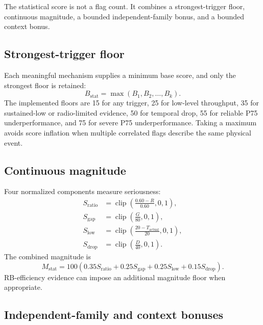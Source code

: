 The statistical score is not a flag count. It combines a strongest-trigger floor, continuous magnitude, a bounded independent-family bonus, and a bounded context bonus.

\subsection{Strongest-trigger floor}

Each meaningful mechanism supplies a minimum base score, and only the strongest floor is retained:
\begin{equation}
B_{\mathrm{stat}}=\max(B_1,B_2,\ldots,B_k).
\end{equation}
The implemented floors are 15 for any trigger, 25 for low-level throughput, 35 for sustained-low or radio-limited evidence, 50 for temporal drop, 55 for reliable P75 underperformance, and 75 for severe P75 underperformance. Taking a maximum avoids score inflation when multiple correlated flags describe the same physical event.

\subsection{Continuous magnitude}

Four normalized components measure seriousness:
\begin{align}
S_{\mathrm{ratio}}&=\operatorname{clip}\left(\frac{0.60-R}{0.60},0,1\right),\\
S_{\mathrm{gap}}&=\operatorname{clip}\left(\frac{G}{80},0,1\right),\\
S_{\mathrm{low}}&=\operatorname{clip}\left(\frac{20-T_{\mathrm{actual}}}{20},0,1\right),\\
S_{\mathrm{drop}}&=\operatorname{clip}\left(\frac{D}{40},0,1\right).
\end{align}
The combined magnitude is
\begin{equation}
M_{\mathrm{stat}}=100\left(0.35S_{\mathrm{ratio}}+0.25S_{\mathrm{gap}}+0.25S_{\mathrm{low}}+0.15S_{\mathrm{drop}}\right).
\end{equation}
RB-efficiency evidence can impose an additional magnitude floor when appropriate.

\subsection{Independent-family and context bonuses}

